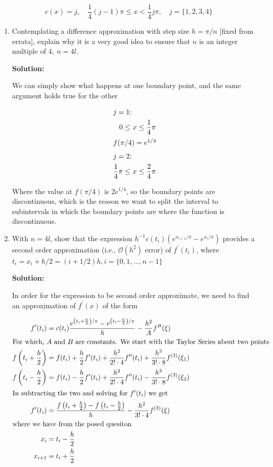 \documentclass[12pt]{article}
\newcommand{\pprime}{\prime \prime}
\newcommand{\BigO}[1]{\mathcal{O}\left( #1 \right)}
\begin{document}
\begin{enumerate}
\[
	c(x) = j, \quad \frac{1}{4}(j-1)\pi \leq x < \frac{1}{4}j\pi, \quad j = \{ 1, 2, 3, 4\}
\]

\begin{enumerate}
\item Contemplating a difference approximation with step size $h = \pi/n$ [fixed from errata], explain why it is a very good idea to ensure that $n$ is an integer multiple of $4,\ n = 4l$. 

{\bf Solution:}

We can simply show what happens at one boundary point, and the same argument holds true for the other

\begin{align*}
\intertext{$j = 1$:}
0 \leq\ &x \leq \frac{1}{4}\pi\\
\intertext{$f(\pi/4) = e^{1/4}$}
\intertext{$j = 2$:}
\frac{1}{4}\pi \leq\ &x \leq \frac{2}{4}\pi
\end{align*}

Where the value at $f(\pi/4)$ is $2e^{1/4}$, so the boundary points are discontinuous, which is the reason we want to split the interval to subintervals in which the boundary points are where the function is discontinuous.

\item With $n = 4l$, show that the expression $h^{-1}c(t_{i})\left( e^{x_{i+1}/\pi} - e^{x_{i}/\pi}\right)$ provides a second order approximation (i.e., $\BigO{h^{2}}$ error) of $f^{\prime}(t_{i})$, where $t_{i} = x_{i} + h/2 = (i + 1/2)h, i = \{ 0, 1, \ldots, n-1\}$

{\bf Solution:}

In order for the expression to be second order approximate, we need to find an approximation of $f^{\prime}(x)$ of the form

\begin{align*}
f^{\prime}(t_{i}) &= c(t_{i})\frac{e^{\left(t_{i} + \frac{h}{2}\right)/\pi} - e^{\left(t_{i} - \frac{h}{2}\right)/\pi}}{h} - \frac{h^{2}}{A}f^{B}(\xi)\\
\intertext{For which, $A$ and $B$ are constants. We start with the Taylor Series about two points}
f\left( t_{i} + \frac{h}{2}\right) &= f(t_{i}) + \frac{h}{2}f^{\prime}(t_{i}) + \frac{h^{2}}{2!\cdot 4}f^{\pprime}(t_{i}) + \frac{h^{3}}{3!\cdot 8}f^{(3)}(\xi_{1})\\
f\left( t_{i} - \frac{h}{2}\right) &= f(t_{i}) - \frac{h}{2}f^{\prime}(t_{i}) + \frac{h^{2}}{2!\cdot 4}f^{\pprime}(t_{i}) - \frac{h^{3}}{3!\cdot 8}f^{(3)}(\xi_{2})\\
\intertext{In subtracting the two and solving for $f^{\prime}(t_{i})$ we get}
f^{\prime}(t_{i}) &= \frac{f\left( t_{i} + \frac{h}{2}\right) - f\left( t_{i} - \frac{h}{2}\right)}{h} - \frac{h^{2}}{3!\cdot 4}f^{(3)}(\xi)\\
\intertext{where we have from the posed quesiton}
x_{i} &= t_{i} - \frac{h}{2}\\
x_{i+1} &= t_{i} + \frac{h}{2}
\end{align*}


\end{enumerate}
\end{enumerate}
\end{document}
